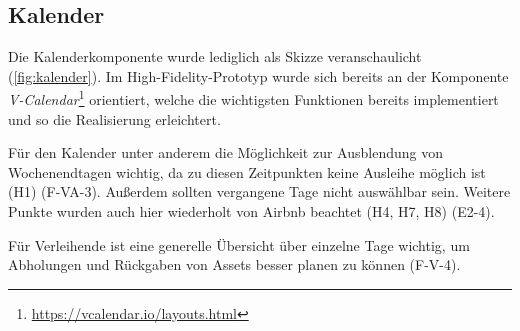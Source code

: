 \subsection{Kalender}
Die Kalenderkomponente wurde lediglich als Skizze veranschaulicht
(\ref{fig:kalender}). Im High-Fidelity-Prototyp wurde sich bereits an der
Komponente
\textit{V-Calendar}\footnote{\url{https://vcalendar.io/layouts.html}}
orientiert, welche die wichtigsten Funktionen bereits implementiert und so die Realisierung
erleichtert.

Für den Kalender unter anderem die Möglichkeit zur Ausblendung von
Wochenendtagen wichtig, da zu diesen Zeitpunkten keine Ausleihe möglich ist (H1)
(F-VA-3). Außerdem sollten vergangene Tage nicht auswählbar sein. Weitere Punkte
wurden auch hier wiederholt von Airbnb beachtet (H4, H7, H8) (E2-4).

Für Verleihende ist eine generelle Übersicht über einzelne Tage wichtig, um
Abholungen und Rückgaben von Assets besser planen zu können (F-V-4).

